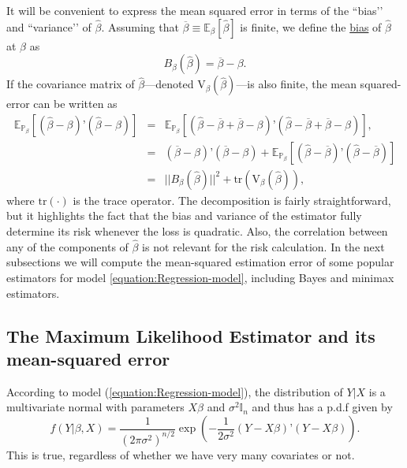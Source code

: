 \documentclass[11pt]{article} %
\begin{document}
It will be convenient to express the mean squared error in terms of the ``bias’’ and ``variance’’ of $\widehat{\beta}$. Assuming that $\overline{\beta}  \equiv \mathbb{E}_{\beta}[ \widehat{\beta} ]$ is finite, we define the \underline{bias} of $\widehat{\beta}$ at $\beta$ as
$$ B_\beta(\widehat{\beta}) = \overline{\beta} - \beta.$$
If the covariance matrix of $\widehat{\beta}$---denoted $\textrm{V}_{\beta} (\widehat{\beta})$---is also finite, the mean squared-error can be written as
\begin{eqnarray*}
\mathbb{E}_{\mathbb{P}_{\beta}}[ (\widehat{\beta}- \beta)’(\widehat{\beta}-\beta) ] &=& \mathbb{E}_{\mathbb{P}_{\beta}}[ (\widehat{\beta}-\overline{\beta} +\overline{\beta} - \beta)’(\widehat{\beta}-\overline{\beta} +\overline{\beta} -\beta) ],  \\
&=& (\overline{\beta}-\beta)’(\overline{\beta}-\beta) +  \mathbb{E}_{\mathbb{P}_{\beta}}[ (\widehat{\beta}-\overline{\beta} )’(\widehat{\beta}-\overline{\beta}) ]  \\
&=& ||B_\beta(\widehat{\beta})  ||^2 + \textrm{tr} \left( \textrm{V}_{\beta} (\widehat{\beta}) \right),
\end{eqnarray*}
where $\textrm{tr}(\cdot)$ is the trace operator.  The decomposition is fairly straightforward, but it highlights the fact that the bias and variance of the estimator fully determine its risk whenever the loss is quadratic. Also, the correlation between any of the components of $\widehat{\beta}$ is not relevant for the risk calculation. In the next subsections we will compute the mean-squared estimation error of some popular estimators for model \eqref{equation:Regression-model}, including Bayes and minimax estimators.


\subsection{The Maximum Likelihood Estimator and its mean-squared error}

According to model (\ref{equation:Regression-model}), the distribution of $Y|X$ is a multivariate normal with parameters $X\beta$ and $\sigma^2 \mathbb{I}_n$ and thus has a p.d.f given by
\begin{equation}\label{equation:Regression-pdf}
f( Y | \beta , X ) = \frac{1}{(2 \pi \sigma^2)^{n/2}} \exp \left( -\frac{1}{2 \sigma^2} (Y - X \beta)’ (Y-X\beta) \right).  
\end{equation}
This is true, regardless of whether we have very many covariates or not. 
\end{document}

